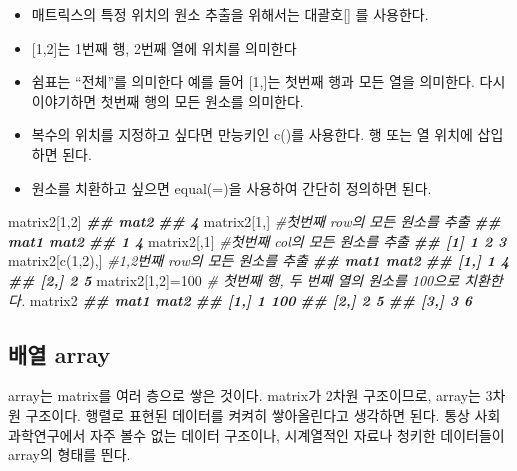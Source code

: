 \documentclass[
]{book}
\newenvironment{Shaded}{\begin{snugshade}}{\end{snugshade}}
\newcommand{\CommentTok}[1]{\textcolor[rgb]{0.56,0.35,0.01}{\textit{#1}}}
\newcommand{\DecValTok}[1]{\textcolor[rgb]{0.00,0.00,0.81}{#1}}
\newcommand{\DocumentationTok}[1]{\textcolor[rgb]{0.56,0.35,0.01}{\textbf{\textit{#1}}}}
\newcommand{\FunctionTok}[1]{\textcolor[rgb]{0.00,0.00,0.00}{#1}}
\newcommand{\NormalTok}[1]{#1}
\newcommand{\OtherTok}[1]{\textcolor[rgb]{0.56,0.35,0.01}{#1}}
\providecommand{\tightlist}{%
  \setlength{\itemsep}{0pt}\setlength{\parskip}{0pt}}
\theoremstyle{definition}
\theoremstyle{definition}
\theoremstyle{definition}
\theoremstyle{definition}
\theoremstyle{remark}
\begin{document}
\begin{itemize}
\tightlist
\item
  매트릭스의 특정 위치의 원소 추출을 위해서는 대괄호{[}{]} 를 사용한다.
\item
  {[}1,2{]}는 1번째 행, 2번째 열에 위치를 의미한다
\item
  쉼표는 ``전체''를 의미한다 예를 들어 {[}1,{]}는 첫번째 행과 모든 열을 의미한다. 다시 이야기하면 첫번째 행의 모든 원소를 의미한다.
\item
  복수의 위치를 지정하고 싶다면 만능키인 c()를 사용한다. 행 또는 열 위치에 삽입하면 된다.
\item
  원소를 치환하고 싶으면 equal(=)을 사용하여 간단히 정의하면 된다.
\end{itemize}

\begin{Shaded}
\begin{Highlighting}[]
\NormalTok{matrix2[}\DecValTok{1}\NormalTok{,}\DecValTok{2}\NormalTok{]}
\DocumentationTok{\#\# mat2 }
\DocumentationTok{\#\#    4}
\NormalTok{matrix2[}\DecValTok{1}\NormalTok{,] }\CommentTok{\#첫번째 row의 모든 원소를 추출}
\DocumentationTok{\#\# mat1 mat2 }
\DocumentationTok{\#\#    1    4}
\NormalTok{matrix2[,}\DecValTok{1}\NormalTok{] }\CommentTok{\#첫번째 col의 모든 원소를 추출}
\DocumentationTok{\#\# [1] 1 2 3}
\NormalTok{matrix2[}\FunctionTok{c}\NormalTok{(}\DecValTok{1}\NormalTok{,}\DecValTok{2}\NormalTok{),] }\CommentTok{\#1,2번째 row의 모든 원소를 추출}
\DocumentationTok{\#\#      mat1 mat2}
\DocumentationTok{\#\# [1,]    1    4}
\DocumentationTok{\#\# [2,]    2    5}
\NormalTok{matrix2[}\DecValTok{1}\NormalTok{,}\DecValTok{2}\NormalTok{]}\OtherTok{=}\DecValTok{100} \CommentTok{\# 첫번째 행, 두 번째 열의 원소를 100으로 치환한다. }
\NormalTok{matrix2}
\DocumentationTok{\#\#      mat1 mat2}
\DocumentationTok{\#\# [1,]    1  100}
\DocumentationTok{\#\# [2,]    2    5}
\DocumentationTok{\#\# [3,]    3    6}
\end{Highlighting}
\end{Shaded}

\hypertarget{uxbc30uxc5f4-array}{%
\subsection{배열 array}\label{uxbc30uxc5f4-array}}

array는 matrix를 여러 층으로 쌓은 것이다. matrix가 2차원 구조이므로, array는 3차원 구조이다. 행렬로 표현된 데이터를 켜켜히 쌓아올린다고 생각하면 된다. 통상 사회과학연구에서 자주 볼수 없는 데이터 구조이나, 시계열적인 자료나 청키한 데이터들이 array의 형태를 띈다.
\end{document}

